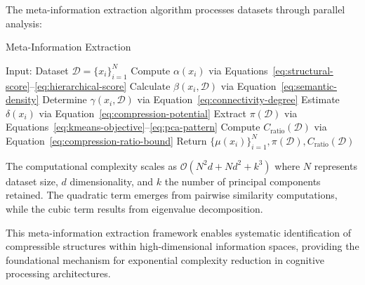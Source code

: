 \documentclass[11pt,a4paper]{article}
\begin{document}
The meta-information extraction algorithm processes datasets through parallel analysis:

\begin{algorithm}[H]
\caption{Meta-Information Extraction}
\begin{algorithmic}[1]
\STATE Input: Dataset $\mathcal{D} = \{x_i\}_{i=1}^N$
    \STATE Compute $\alpha(x_i)$ via Equations~\eqref{eq:structural-score}--\eqref{eq:hierarchical-score}
    \STATE Calculate $\beta(x_i, \mathcal{D})$ via Equation~\eqref{eq:semantic-density}
    \STATE Determine $\gamma(x_i, \mathcal{D})$ via Equation~\eqref{eq:connectivity-degree}
    \STATE Estimate $\delta(x_i)$ via Equation~\eqref{eq:compression-potential}
\ENDFOR
\STATE Extract $\pi(\mathcal{D})$ via Equations~\eqref{eq:kmeans-objective}--\eqref{eq:pca-pattern}
\STATE Compute $C_{\text{ratio}}(\mathcal{D})$ via Equation~\eqref{eq:compression-ratio-bound}
\STATE Return $\{\mu(x_i)\}_{i=1}^N, \pi(\mathcal{D}), C_{\text{ratio}}(\mathcal{D})$
\end{algorithmic}
\end{algorithm}

The computational complexity scales as $\mathcal{O}(N^2 d + N d^2 + k^3)$ where $N$ represents dataset size, $d$ dimensionality, and $k$ the number of principal components retained. The quadratic term emerges from pairwise similarity computations, while the cubic term results from eigenvalue decomposition.

This meta-information extraction framework enables systematic identification of compressible structures within high-dimensional information spaces, providing the foundational mechanism for exponential complexity reduction in cognitive processing architectures.
\end{document}
